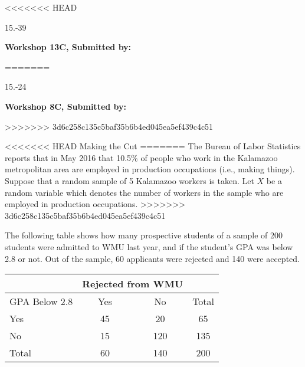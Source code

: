 <<<<<<< HEAD
\begin{exsol@exercise}{15.-39}
    \begin{center}
\begin{flushleft}\textbf{\large \hfill Workshop 13C, Submitted by: }\end{flushleft}
=======
\begin{exsol@exercise}{15.-24}
    \begin{center}
\begin{flushleft}\textbf{\large \hfill Workshop 8C, Submitted by: }\end{flushleft}
>>>>>>> 3d6c258c135c5baf35b6b4ed045ea5ef439c4c51

\end{center}

<<<<<<< HEAD
Making the Cut
=======
The Bureau of Labor Statistics reports that in May 2016 that 10.5\% of people who work in the Kalamazoo metropolitan area are employed in production occupations (i.e., making things). Suppose that a random sample of 5 Kalamazoo workers is taken. Let $X$ be a random variable which denotes the number of workers in the sample who are employed in production occupations.
>>>>>>> 3d6c258c135c5baf35b6b4ed045ea5ef439c4c51

The following table shows how many prospective students of a sample of 200 students were admitted to WMU last year, and if the student's GPA was below 2.8 or not. Out of the sample, 60 applicants were rejected and 140 were accepted.
			
\begin{tabular}{@{} lccc @{}} \hline				
 	& \multicolumn{2}{c}{Rejected from WMU} \\ \hline				
GPA Below 2.8 &	Yes &	No &	Total  \\ \hline
Yes &	45 &	20 &	65 \\
No &	15 &	120 &	135 \\ \hline
Total &	60 &	140 &	200 \\ \hline
\end{tabular}
				

\end{exsol@exercise}
\end{center}
\end{exsol@exercise}
